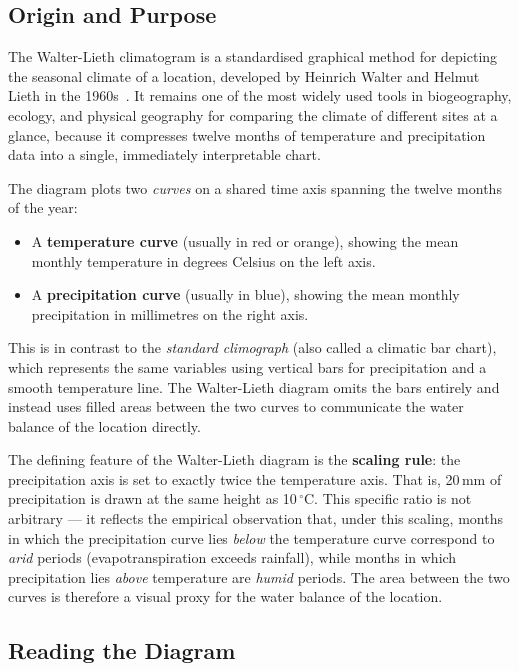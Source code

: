 \subsection{Origin and Purpose}\label{REL_WL_ORIGIN}

The Walter-Lieth climatogram is a standardised graphical method for depicting
the seasonal climate of a location, developed by Heinrich Walter and
Helmut Lieth
in the 1960s~\cite{walter1960}. It remains one of the most widely used tools in
biogeography, ecology, and physical geography for comparing the climate of
different sites at a glance, because it compresses twelve months of temperature
and precipitation data into a single, immediately interpretable chart.

The diagram plots two \emph{curves} on a shared time axis spanning the twelve
months of the year:

\begin{itemize}
  \item A \textbf{temperature curve} (usually in red or orange), showing the
    mean monthly temperature in degrees Celsius on the left axis.
  \item A \textbf{precipitation curve} (usually in blue), showing the mean
    monthly precipitation in millimetres on the right axis.
\end{itemize}

This is in contrast to the \emph{standard climograph} (also called a climatic
bar chart), which represents the same variables using vertical bars for
precipitation and a smooth temperature line. The Walter-Lieth diagram omits the
bars entirely and instead uses filled areas between the two curves to
communicate
the water balance of the location directly.

The defining feature of the Walter-Lieth diagram is the \textbf{scaling rule}:
the precipitation axis is set to exactly twice the temperature axis. That is,
20\,mm of precipitation is drawn at the same height as 10\,$^\circ$C. This
specific ratio is not arbitrary --- it reflects the empirical observation that,
under this scaling, months in which the precipitation curve lies \emph{below}
the temperature curve correspond to \emph{arid} periods (evapotranspiration
exceeds rainfall), while months in which precipitation lies \emph{above}
temperature are \emph{humid} periods. The area between the two curves is
therefore a visual proxy for the water balance of the location.

\subsection{Reading the Diagram}\label{REL_WL_READING}

